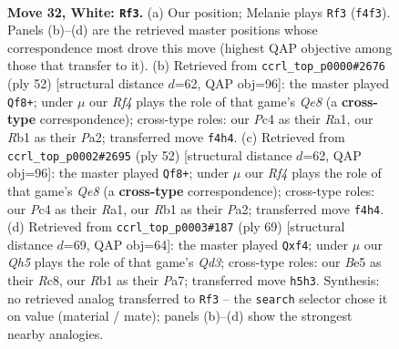 \documentclass[11pt]{article}
\begin{document}
\clearpage

\begin{figure}[p]\centering
\begin{subfigure}{0.46\textwidth}\centering
\resizebox{\linewidth}{!}{%
\newchessgame
\chessboard[
  setfen={3r1rk1/7n/1pq5/p1p1Bp1Q/2P2R2/1P5p/P2P4/1R4K1 w - - 1 32},
  showmover=false,
  pgfstyle=straightmove, color=movearrow, markmove={f4-f3}
]}
\caption{}
\end{subfigure}\hfill
\begin{subfigure}{0.46\textwidth}\centering
\resizebox{\linewidth}{!}{%
\newchessgame
\chessboard[
  setfen={rn2Q3/p3p3/1p1p3k/4r2p/4q2P/2P5/PP2p1P1/R3R1K1 w - - 0 27},
  showmover=false,
  pgfstyle=straightmove, color=movearrow, markmove={e8-f8}
]}
\caption{}
\end{subfigure}
\\[4pt]
\begin{subfigure}{0.46\textwidth}\centering
\resizebox{\linewidth}{!}{%
\newchessgame
\chessboard[
  setfen={rn2Q3/p3p3/1p1p3k/4r2p/4q2P/2P5/PP2p1P1/R3R1K1 w - - 0 27},
  showmover=false,
  pgfstyle=straightmove, color=movearrow, markmove={e8-f8}
]}
\caption{}
\end{subfigure}\hfill
\begin{subfigure}{0.46\textwidth}\centering
\resizebox{\linewidth}{!}{%
\newchessgame
\chessboard[
  setfen={2r1r3/pp4k1/3qPpp1/2n4p/2P2P2/2Q2N1P/6P1/3RR1K1 b - - 0 35},
  showmover=false,
  pgfstyle=straightmove, color=movearrow, markmove={d6-f4}
]}
\caption{}
\end{subfigure}
\caption{\textbf{Move 32, White: \texttt{Rf3}.} (a) Our position; Melanie plays \texttt{Rf3} (\texttt{f4f3}). Panels (b)--(d) are the retrieved master positions whose correspondence most drove this move (highest QAP objective among those that transfer to it). (b) Retrieved from \texttt{ccrl\_top\_p0000\#2676} (ply 52) [structural distance $d$=62, QAP obj=96]: the master played \texttt{Qf8+}; under $\mu$ our \emph{Rf4} plays the role of that game's \emph{Qe8} (a \textbf{cross-type} correspondence); cross-type roles: our \emph{P}c4 as their \emph{R}a1, our \emph{R}b1 as their \emph{P}a2; transferred move \texttt{f4h4}. (c) Retrieved from \texttt{ccrl\_top\_p0002\#2695} (ply 52) [structural distance $d$=62, QAP obj=96]: the master played \texttt{Qf8+}; under $\mu$ our \emph{Rf4} plays the role of that game's \emph{Qe8} (a \textbf{cross-type} correspondence); cross-type roles: our \emph{P}c4 as their \emph{R}a1, our \emph{R}b1 as their \emph{P}a2; transferred move \texttt{f4h4}. (d) Retrieved from \texttt{ccrl\_top\_p0003\#187} (ply 69) [structural distance $d$=69, QAP obj=64]: the master played \texttt{Qxf4}; under $\mu$ our \emph{Qh5} plays the role of that game's \emph{Qd3}; cross-type roles: our \emph{B}e5 as their \emph{R}c8, our \emph{R}b1 as their \emph{P}a7; transferred move \texttt{h5h3}. Synthesis: no retrieved analog transferred to \texttt{Rf3} -- the \texttt{search} selector chose it on value (material / mate); panels (b)--(d) show the strongest nearby analogies.}
\label{fig:thought-m62}
\end{figure}
\end{document}
